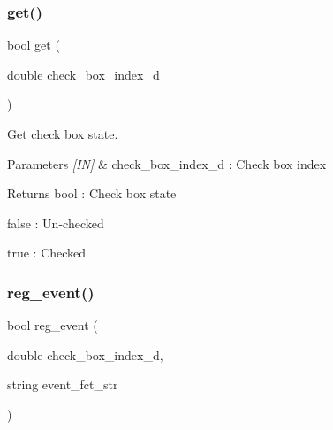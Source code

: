\subsubsection{get()}
{\footnotesize\ttfamily bool get (\begin{DoxyParamCaption}\item[{double}]{check\+\_\+box\+\_\+index\+\_\+d }\end{DoxyParamCaption})}



Get check box state. 


\begin{DoxyCode}{0}
\end{DoxyCode}



\begin{DoxyParams}{Parameters}
{\em \mbox{[}\+I\+N\mbox{]}} & check\+\_\+box\+\_\+index\+\_\+d \+: Check box index \\
\hline
\end{DoxyParams}
\begin{DoxyReturn}{Returns}
bool \+: Check box state \begin{DoxyItemize}
\item false \+: Un-\/checked \item true \+: Checked \end{DoxyItemize}

\end{DoxyReturn}
\mbox{\label{classcheck__box_aca4db2446dfef881cb9fbd9dc3326733}} 
\subsubsection{reg\_event()}
{\footnotesize\ttfamily bool reg\+\_\+event (\begin{DoxyParamCaption}\item[{double}]{check\+\_\+box\+\_\+index\+\_\+d,  }\item[{string}]{event\+\_\+fct\+\_\+str }\end{DoxyParamCaption})}



